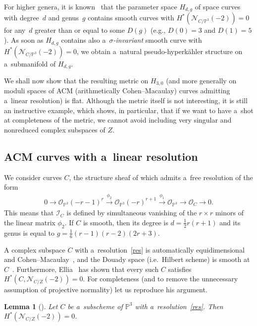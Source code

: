 \documentclass[pdftex]{sigma}
\numberwithin{equation}{section}
\newtheorem{Lemma}[Theorem]{Lemma}
\begin{document}
For higher genera, it is known~\cite{EH} that the parameter space $H_{d,g}$ of space curves with degree~$d$ and genus~$g$ contains smooth curves with $H^\ast({\mathcal{N}}_{C/{\mathbb{P}}^3}(-2))=0$ for any~$d$ greater than or equal to
some $D(g)$ (e.g., $D(0)=3$ and $D(1)=5$).
As soon as $H_{d,g}$ contains also a~{\em $\sigma$-invariant} smooth curve with
$H^\ast({\mathcal{N}}_{C/{\mathbb{P}}^3}(-2))=0$, we obtain a~natural pseudo-hyperk\"ahler structure on a~submanifold of
$H_{d,g}$.

We shall now show that the resulting metric on $H_{3,0}$ (and more generally on moduli spaces of ACM (arithmetically
Cohen--Macaulay) curves admitting a~linear resolution) is f\/lat.
Although the metric itself is not interesting, it is still an instructive example, which shows, in particular, that if
we want to have a~shot at completeness of the metric, we cannot avoid including very singular and nonreduced complex
subspaces of $Z$.

\subsection{ACM curves with a~linear resolution}

We consider curves $C$, the structure sheaf of which admits a~free resolution of the form
\begin{gather}
0\to {\mathcal{O}}_{{\mathbb{P}}^3}(-r-1)^r\stackrel{\phi_2}{\longrightarrow} {\mathcal{O}}_{{\mathbb{P}}^3}(-r)^{r+1}
\stackrel{\phi_1}{\longrightarrow} {\mathcal{O}}_{{\mathbb{P}}^3} \longrightarrow {\mathcal{O}}_C\to 0.
\label{res}
\end{gather}
This means that ${\mathcal{I}}_C$ is def\/ined by simultaneous vanishing of the $r\times r$ minors of the linear matrix
$\phi_2$.
If $C$ is smooth, then its degree is $d=\frac{1}{2}r(r+1)$ and its genus is equal to $g=\frac{1}{6}(r-1)(r-2)(2r+3)$.

A complex subspace $C$ with a~resolution~\eqref{res} is automatically equidimensional and Cohen--Macaulay~\cite[Theorem~18.18]{Eis1}, and the Douady space (i.e.\
Hilbert scheme) is smooth at $C$~\cite[Co\-rol\-lary~8.10]{Hartsh}.
Furthermore, Ellia~\cite{Ellia} has shown that every such $C$ satisf\/ies \mbox{$H^\ast(C,{\mathcal{N}}_{C/Z}(-2))=0$}.
For completeness (and to remove the unnecessary assumption of projective normality) let us reproduce his argument.
\begin{Lemma}[\protect{\cite{Ellia}}]
Let $C$ be a~subscheme of ${\mathbb{P}}^3$ with a~resolution~\eqref{res}.
Then $H^\ast({\mathcal{N}}_{C/Z}(-2))=0$.
\end{Lemma}
\end{document}
